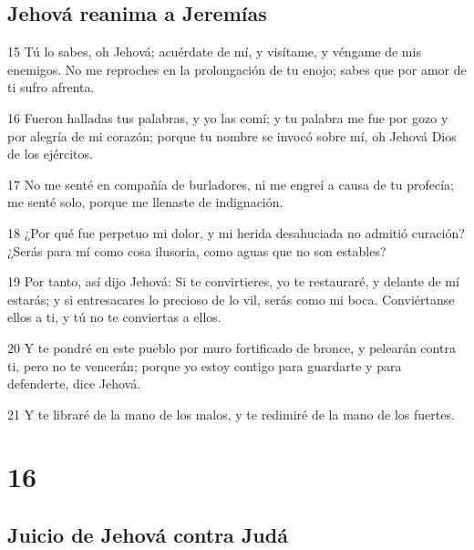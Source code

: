 \section*{Jehová reanima a Jeremías}

\par 15 Tú lo sabes, oh Jehová; acuérdate de mí, y visítame, y véngame de mis enemigos. No me reproches en la prolongación de tu enojo; sabes que por amor de ti sufro afrenta.
\par 16 Fueron halladas tus palabras, y yo las comí; y tu palabra me fue por gozo y por alegría de mi corazón; porque tu nombre se invocó sobre mí, oh Jehová Dios de los ejércitos.
\par 17 No me senté en compañía de burladores, ni me engreí a causa de tu profecía; me senté solo, porque me llenaste de indignación.
\par 18 ¿Por qué fue perpetuo mi dolor, y mi herida desahuciada no admitió curación? ¿Serás para mí como cosa ilusoria, como aguas que no son estables?
\par 19 Por tanto, así dijo Jehová: Si te convirtieres, yo te restauraré, y delante de mí estarás; y si entresacares lo precioso de lo vil, serás como mi boca. Conviértanse ellos a ti, y tú no te conviertas a ellos.
\par 20 Y te pondré en este pueblo por muro fortificado de bronce, y pelearán contra ti, pero no te vencerán; porque yo estoy contigo para guardarte y para defenderte, dice Jehová.
\par 21 Y te libraré de la mano de los malos, y te redimiré de la mano de los fuertes.

\chapter{16}

\section*{Juicio de Jehová contra Judá}

